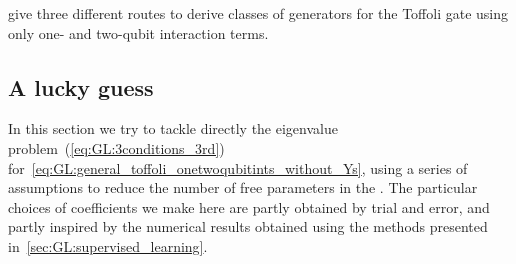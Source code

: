  give three different routes to derive classes of generators for the Toffoli gate using only one- and two-qubit interaction terms.

\subsection{A lucky guess}
\label{subsec:GL:lucky_guess}

In this section we try to tackle directly the eigenvalue problem~(\ref{eq:GL:3conditions_3rd}) for~\cref{eq:GL:general_toffoli_onetwoqubitints_without_Ys}, using a series of assumptions to reduce the number of free parameters in the \ansatz. The particular choices of coefficients we make here are partly obtained by trial and error, and partly inspired by the numerical results obtained using the methods presented in~\cref{sec:GL:supervised_learning}.

